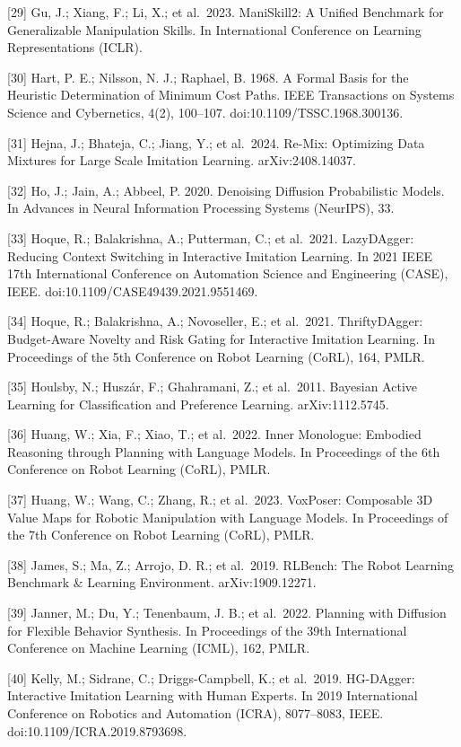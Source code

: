 \documentclass[
  11pt,
]{article}
\begin{document}
{[}29{]} Gu, J.; Xiang, F.; Li, X.; et al.~2023. ManiSkill2: A Unified
Benchmark for Generalizable Manipulation Skills. In International
Conference on Learning Representations (ICLR).

{[}30{]} Hart, P. E.; Nilsson, N. J.; Raphael, B. 1968. A Formal Basis
for the Heuristic Determination of Minimum Cost Paths. IEEE Transactions
on Systems Science and Cybernetics, 4(2), 100--107.
doi:10.1109/TSSC.1968.300136.

{[}31{]} Hejna, J.; Bhateja, C.; Jiang, Y.; et al.~2024. Re-Mix:
Optimizing Data Mixtures for Large Scale Imitation Learning.
arXiv:2408.14037.

{[}32{]} Ho, J.; Jain, A.; Abbeel, P. 2020. Denoising Diffusion
Probabilistic Models. In Advances in Neural Information Processing
Systems (NeurIPS), 33.

{[}33{]} Hoque, R.; Balakrishna, A.; Putterman, C.; et al.~2021.
LazyDAgger: Reducing Context Switching in Interactive Imitation
Learning. In 2021 IEEE 17th International Conference on Automation
Science and Engineering (CASE), IEEE.
doi:10.1109/CASE49439.2021.9551469.

{[}34{]} Hoque, R.; Balakrishna, A.; Novoseller, E.; et al.~2021.
ThriftyDAgger: Budget-Aware Novelty and Risk Gating for Interactive
Imitation Learning. In Proceedings of the 5th Conference on Robot
Learning (CoRL), 164, PMLR.

{[}35{]} Houlsby, N.; Huszár, F.; Ghahramani, Z.; et al.~2011. Bayesian
Active Learning for Classification and Preference Learning.
arXiv:1112.5745.

{[}36{]} Huang, W.; Xia, F.; Xiao, T.; et al.~2022. Inner Monologue:
Embodied Reasoning through Planning with Language Models. In Proceedings
of the 6th Conference on Robot Learning (CoRL), PMLR.

{[}37{]} Huang, W.; Wang, C.; Zhang, R.; et al.~2023. VoxPoser:
Composable 3D Value Maps for Robotic Manipulation with Language Models.
In Proceedings of the 7th Conference on Robot Learning (CoRL), PMLR.

{[}38{]} James, S.; Ma, Z.; Arrojo, D. R.; et al.~2019. RLBench: The
Robot Learning Benchmark \& Learning Environment. arXiv:1909.12271.

{[}39{]} Janner, M.; Du, Y.; Tenenbaum, J. B.; et al.~2022. Planning
with Diffusion for Flexible Behavior Synthesis. In Proceedings of the
39th International Conference on Machine Learning (ICML), 162, PMLR.

{[}40{]} Kelly, M.; Sidrane, C.; Driggs-Campbell, K.; et al.~2019.
HG-DAgger: Interactive Imitation Learning with Human Experts. In 2019
International Conference on Robotics and Automation (ICRA), 8077--8083,
IEEE. doi:10.1109/ICRA.2019.8793698.
\end{document}
